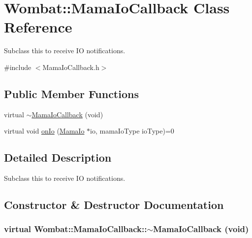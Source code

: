 \hypertarget{classWombat_1_1MamaIoCallback}{
\section{Wombat::MamaIoCallback Class Reference}
\label{classWombat_1_1MamaIoCallback}
}


Subclass this to receive IO notifications.  


{\ttfamily \#include $<$MamaIoCallback.h$>$}\subsection*{Public Member Functions}
\begin{DoxyCompactItemize}
\item 
virtual \hyperlink{classWombat_1_1MamaIoCallback_a158716899941cb9b58437f301bd375c5}{$\sim$MamaIoCallback} (void)
\item 
virtual void \hyperlink{classWombat_1_1MamaIoCallback_a78da8cc97fc5c91bc3d8689f3d662cc2}{onIo} (\hyperlink{classWombat_1_1MamaIo}{MamaIo} $\ast$io, mamaIoType ioType)=0
\end{DoxyCompactItemize}


\subsection{Detailed Description}
Subclass this to receive IO notifications. 

\subsection{Constructor \& Destructor Documentation}
\hypertarget{classWombat_1_1MamaIoCallback_a158716899941cb9b58437f301bd375c5}{
\subsubsection[{$\sim$MamaIoCallback}]{\setlength{\rightskip}{0pt plus 5cm}virtual Wombat::MamaIoCallback::$\sim$MamaIoCallback (void)}}
\label{classWombat_1_1MamaIoCallback_a158716899941cb9b58437f301bd375c5}


